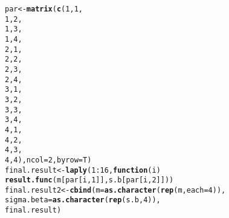 \documentclass{article}\usepackage[]{graphicx}\usepackage[]{color}
\makeatletter
\newcommand{\hlnum}[1]{\textcolor[rgb]{0.686,0.059,0.569}{#1}}%
\newcommand{\hlopt}[1]{\textcolor[rgb]{0,0,0}{#1}}%
\newcommand{\hlstd}[1]{\textcolor[rgb]{0.345,0.345,0.345}{#1}}%
\newcommand{\hlkwa}[1]{\textcolor[rgb]{0.161,0.373,0.58}{\textbf{#1}}}%
\newcommand{\hlkwb}[1]{\textcolor[rgb]{0.69,0.353,0.396}{#1}}%
\newcommand{\hlkwc}[1]{\textcolor[rgb]{0.333,0.667,0.333}{#1}}%
\newcommand{\hlkwd}[1]{\textcolor[rgb]{0.737,0.353,0.396}{\textbf{#1}}}%
\newenvironment{kframe}{%
 \def\at@end@of@kframe{}%
 \ifinner\ifhmode%
  \def\at@end@of@kframe{\end{minipage}}%
  \begin{minipage}{\columnwidth}%
 \fi\fi%
 \def\FrameCommand##1{\hskip\@totalleftmargin \hskip-\fboxsep
 \colorbox{shadecolor}{##1}\hskip-\fboxsep
     \hskip-\linewidth \hskip-\@totalleftmargin \hskip\columnwidth}%
 \MakeFramed {\advance\hsize-\width
   \@totalleftmargin\z@ \linewidth\hsize
   \@setminipage}}%
 {\par\unskip\endMakeFramed%
 \at@end@of@kframe}
\makeatother
\begin{document}
\begin{kframe}
\begin{alltt}
\hlstd{par} \hlkwb{<-} \hlkwd{matrix}\hlstd{(}\hlkwd{c}\hlstd{(}\hlnum{1}\hlstd{,}\hlnum{1}\hlstd{,}
                \hlnum{1}\hlstd{,} \hlnum{2}\hlstd{,}
                \hlnum{1}\hlstd{,}\hlnum{3}\hlstd{,}
                \hlnum{1}\hlstd{,}\hlnum{4}\hlstd{,}
                \hlnum{2}\hlstd{,}\hlnum{1}\hlstd{,}
                \hlnum{2}\hlstd{,}\hlnum{2}\hlstd{,}
                \hlnum{2}\hlstd{,}\hlnum{3}\hlstd{,}
                \hlnum{2}\hlstd{,}\hlnum{4}\hlstd{,}
                \hlnum{3}\hlstd{,}\hlnum{1}\hlstd{,}
                \hlnum{3}\hlstd{,}\hlnum{2}\hlstd{,}
                \hlnum{3}\hlstd{,}\hlnum{3}\hlstd{,}
                \hlnum{3}\hlstd{,}\hlnum{4}\hlstd{,}
                \hlnum{4}\hlstd{,}\hlnum{1}\hlstd{,}
                \hlnum{4}\hlstd{,}\hlnum{2}\hlstd{,}
                \hlnum{4}\hlstd{,}\hlnum{3}\hlstd{,}
                \hlnum{4}\hlstd{,}\hlnum{4}\hlstd{),} \hlkwc{ncol} \hlstd{=} \hlnum{2}\hlstd{,} \hlkwc{byrow} \hlstd{= T)}
\hlstd{final.result} \hlkwb{<-} \hlkwd{laply}\hlstd{(}\hlnum{1}\hlopt{:}\hlnum{16}\hlstd{,} \hlkwa{function}\hlstd{(}\hlkwc{i}\hlstd{)}
  \hlkwd{result.func}\hlstd{(m[par[i,}\hlnum{1}\hlstd{]],s.b[par[i,}\hlnum{2}\hlstd{]]))}
\hlstd{final.result2} \hlkwb{<-} \hlkwd{cbind}\hlstd{(}\hlkwc{m} \hlstd{=} \hlkwd{as.character}\hlstd{(}\hlkwd{rep}\hlstd{(m,} \hlkwc{each} \hlstd{=} \hlnum{4}\hlstd{)),}
                       \hlkwc{sigma.beta} \hlstd{=} \hlkwd{as.character}\hlstd{(}\hlkwd{rep}\hlstd{(s.b,} \hlnum{4}\hlstd{)),}
                       \hlstd{final.result)}
\end{alltt}
\end{kframe}
\end{document}
